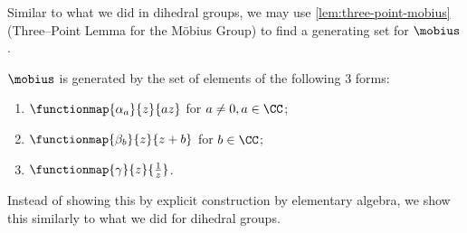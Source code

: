 Similar to what we did in dihedral groups, we may use \autoref{lem:three-point-mobius} (Three--Point Lemma for the M\"{o}bius Group) to find a generating set for \(\mobius\).

\begin{proposition}
    \label{prop:generating-set-mobius}%
    \(\mobius\) is generated by the set of elements of the following \(3\) forms:
    \begin{enumerate}
        \item \(\functionmap{\alpha_{a}}{z}{az}\) for \(a \neq 0, a \in \CC\);
        \item \(\functionmap{\beta_{b}}{z}{z + b}\) for \(b \in \CC\);
        \item \(\functionmap{\gamma}{z}{\frac{1}{z}}\).
    \end{enumerate}
\end{proposition}

Instead of showing this by explicit construction by elementary algebra, we show this similarly to what we did for dihedral groups.

